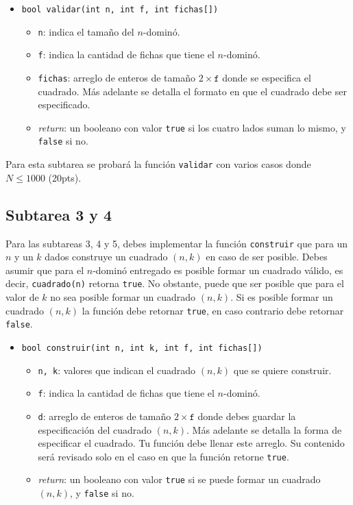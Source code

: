 \documentclass{oci}
\begin{document}
\begin{itemize}
 \item \verb+bool validar(int n, int f, int fichas[])+
 \begin{itemize}
  \item \verb+n+: indica el tamaño del $n$-dominó.
  \item \verb+f+: indica la cantidad de fichas que tiene el $n$-dominó.
  \item \verb+fichas+: arreglo de enteros de tamaño $2\times\texttt{f}$ donde se especifica el cuadrado. Más adelante se detalla el formato en que el cuadrado debe ser especificado.
  \item \emph{return}: un booleano con valor \verb+true+ si los cuatro lados suman lo mismo, y \verb+false+ si no.
 \end{itemize}
\end{itemize}

Para esta subtarea se probará la función \verb+validar+ con varios casos donde $N\leq 1000$ (20pts).

\subsection*{Subtarea 3 y 4}
Para las subtareas 3, 4 y 5, debes implementar la función \verb+construir+ que para un $n$ y un $k$ dados construye un cuadrado $(n,k)$ en caso de ser posible.
Debes asumir que para el $n$-dominó entregado es posible formar un cuadrado válido, es decir, \verb+cuadrado(n)+ retorna \verb+true+.
No obstante, puede que ser posible que para el valor de $k$ no sea posible formar un cuadrado $(n,k)$.
Si es posible formar un cuadrado $(n,k)$ la función debe retornar \verb+true+, en caso contrario debe retornar \verb+false+.
\begin{itemize}
 \item \verb+bool construir(int n, int k, int f, int fichas[])+
 \begin{itemize}
  \item \verb+n, k+: valores que indican el cuadrado $(n,k)$ que se quiere construir.
  \item \verb+f+: indica la cantidad de fichas que tiene el $n$-dominó.
  \item \verb+d+: arreglo de enteros de tamaño $2\times\texttt{f}$ donde debes guardar la especificación del cuadrado $(n,k)$. Más adelante se detalla la forma de especificar el cuadrado.
    Tu función debe llenar este arreglo. Su contenido será revisado solo en el caso en que la función retorne \verb+true+.
  \item \emph{return}: un booleano con valor \verb+true+ si se puede formar un cuadrado $(n,k)$, y \verb+false+ si no.
 \end{itemize}
\end{itemize}
\end{document}

